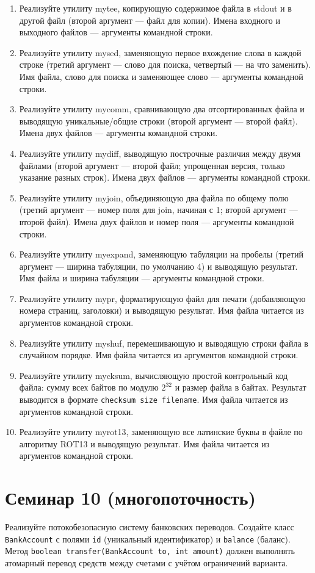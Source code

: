\documentclass[12pt]{article}
\begin{document}
\begin{enumerate}
    \item Реализуйте утилиту mytee, копирующую содержимое файла в stdout и в другой файл (второй аргумент — файл для копии). Имена входного и выходного файлов — аргументы командной строки.
    \item Реализуйте утилиту mysed, заменяющую первое вхождение слова в каждой строке (третий аргумент — слово для поиска, четвертый — на что заменить). Имя файла, слово для поиска и заменяющее слово — аргументы командной строки.
    \item Реализуйте утилиту mycomm, сравнивающую два отсортированных файла и выводящую уникальные/общие строки (второй аргумент — второй файл). Имена двух файлов — аргументы командной строки.
    \item Реализуйте утилиту mydiff, выводящую построчные различия между двумя файлами (второй аргумент — второй файл; упрощенная версия, только указание разных строк). Имена двух файлов — аргументы командной строки.
    \item Реализуйте утилиту myjoin, объединяющую два файла по общему полю (третий аргумент — номер поля для join, начиная с 1; второй аргумент — второй файл). Имена двух файлов и номер поля — аргументы командной строки.
    \item Реализуйте утилиту myexpand, заменяющую табуляции на пробелы (третий аргумент — ширина табуляции, по умолчанию 4) и выводящую результат. Имя файла и ширина табуляции — аргументы командной строки.
    \item Реализуйте утилиту mypr, форматирующую файл для печати (добавляющую номера страниц, заголовки) и выводящую результат. Имя файла читается из аргументов командной строки.
    \item Реализуйте утилиту myshuf, перемешивающую и выводящую строки файла в случайном порядке. Имя файла читается из аргументов командной строки.
\item Реализуйте утилиту mycksum, вычисляющую простой контрольный код файла: сумму всех байтов по модулю $2^{32}$ и размер файла в байтах. Результат выводится в формате \texttt{checksum size filename}. Имя файла читается из аргументов командной строки.
\item Реализуйте утилиту myrot13, заменяющую все латинские буквы в файле по алгоритму ROT13 и выводящую результат. Имя файла читается из аргументов командной строки.
    
\end{enumerate}



\section{Семинар 10 (многопоточность)}
Реализуйте потокобезопасную систему банковских переводов. Создайте класс \texttt{BankAccount} с полями \texttt{id} (уникальный идентификатор) и \texttt{balance} (баланс). Метод \texttt{boolean transfer(BankAccount to, int amount)} должен выполнять атомарный перевод средств между счетами с учётом ограничений варианта.
\end{document}
